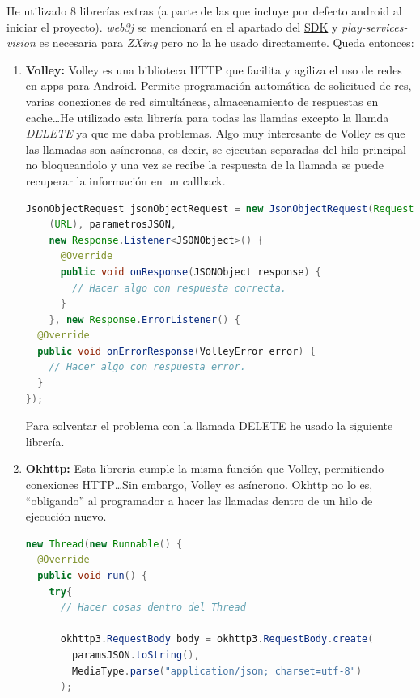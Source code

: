 He utilizado 8 librerías extras (a parte de las que incluye por defecto android al iniciar el proyecto). \emph{web3j} se mencionará en el apartado del \hyperref[sec:SDK]{SDK} y \emph{play-services-vision} es necesaria para \emph{ZXing} pero no la he usado directamente. Queda entonces: \\
\begin{enumerate}
\item \textbf{Volley: } Volley es una biblioteca HTTP que facilita y agiliza el uso de redes en apps para Android. Permite programación automática de solicitued de res, varias conexiones de red simultáneas, almacenamiento de respuestas en cache\dots He utilizado esta librería para todas las llamdas excepto la llamda \emph{DELETE} ya que me daba problemas. Algo muy interesante de Volley es que las llamadas son asíncronas, es decir, se ejecutan separadas del hilo principal no bloqueandolo y una vez se recibe la respuesta de la llamada se puede recuperar la información en un callback.

\begin{lstlisting}[language=Java,float=ht,caption={[Java] Ejemplo de llamada POST con Volley.},label=lst:volley]
JsonObjectRequest jsonObjectRequest = new JsonObjectRequest(Request.Method.POST,
    (URL), parametrosJSON,
    new Response.Listener<JSONObject>() {
      @Override
      public void onResponse(JSONObject response) {
        // Hacer algo con respuesta correcta.
      }
    }, new Response.ErrorListener() {
  @Override
  public void onErrorResponse(VolleyError error) {
    // Hacer algo con respuesta error.
  }
});
\end{lstlisting}

Para solventar el problema con la llamada DELETE he usado la siguiente librería.

\item \textbf{Okhttp: } Esta libreria cumple la misma función que Volley, permitiendo conexiones HTTP\dots Sin embargo, Volley es asíncrono. Okhttp no lo es, ``obligando'' al programador a hacer las llamadas dentro de un hilo de ejecución nuevo.

\begin{lstlisting}[language=Java,float=ht,caption={[Java] Ejemplo de llamada DELETE con OkHttp.},label=lst:okhttp]
new Thread(new Runnable() {
  @Override
  public void run() {
    try{
      // Hacer cosas dentro del Thread

      okhttp3.RequestBody body = okhttp3.RequestBody.create(
        paramsJSON.toString(), 
        MediaType.parse("application/json; charset=utf-8")
      );


\end{lstlisting}
\end{enumerate}

